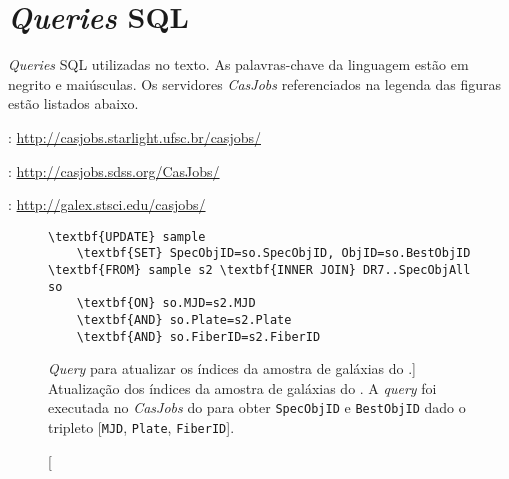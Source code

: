 



\chapter{{\em Queries} SQL}
\label{apendice:Queries}

{\em Queries} SQL utilizadas no texto. As palavras-chave da linguagem
estão em negrito e maiúsculas. Os servidores {\em CasJobs} referenciados na
legenda das figuras estão listados abaixo.

\begin{list}{}{\setlength\itemsep{0pt}}
\item \starlight: \url{http://casjobs.starlight.ufsc.br/casjobs/}
\item \SDSS: \url{http://casjobs.sdss.org/CasJobs/}
\item \galex: \url{http://galex.stsci.edu/casjobs/}
\end{list}



\begin{figure}
\begin{Verbatim}[frame=single,commandchars=\\\{\}]
\textbf{UPDATE} sample
	\textbf{SET} SpecObjID=so.SpecObjID, ObjID=so.BestObjID
\textbf{FROM} sample s2 \textbf{INNER JOIN} DR7..SpecObjAll so
	\textbf{ON} so.MJD=s2.MJD
	\textbf{AND} so.Plate=s2.Plate
	\textbf{AND} so.FiberID=s2.FiberID
\end{Verbatim}
	\caption
	[{\em Query} para atualizar os índices da amostra de galáxias do
	\starlight.]
	{Atualização dos índices da amostra de galáxias do \starlight. A {\em query}
	foi executada no {\em CasJobs} do \SDSS para obter \texttt{SpecObjID} e
	\texttt{BestObjID} dado o tripleto [\texttt{MJD}, \texttt{Plate},
	\texttt{FiberID}].}
	\label{fig:QueryAtualizaObjIds}
\end{figure}


